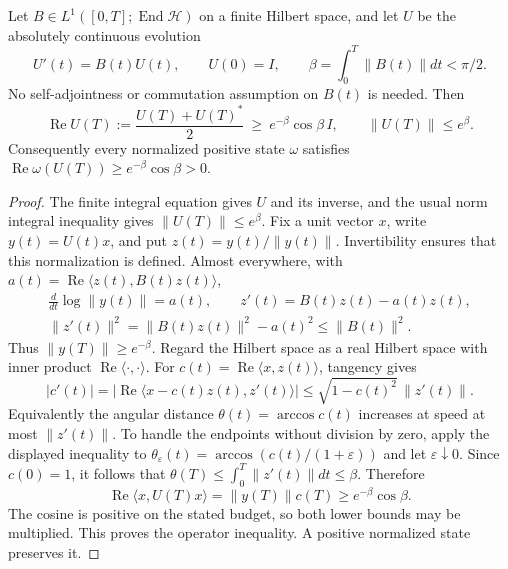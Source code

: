 \documentclass[12pt,a4paper]{article}
\begin{document}
\begin{lemma}
\label{p12:lem:v256-ordered-evolution-accretivity}
Let $B\in L^1([0,T];\operatorname{End}\mathcal H)$ on a finite
Hilbert space, and let $U$ be the absolutely continuous evolution
\[
 U'(t)=B(t)U(t),\qquad U(0)=I,\qquad
 \beta=\int_0^T\|B(t)\|dt<\pi/2.
\]
No self-adjointness or commutation assumption on $B(t)$ is needed.  Then
\begin{equation}
 \operatorname{Re}U(T):=\frac{U(T)+U(T)^*}{2}
 \ \ge\ e^{-\beta}\cos\beta\,I,
 \qquad \|U(T)\|\le e^\beta.
 \label{p12:eq:v256-ordered-accretivity}
\end{equation}
Consequently every normalized positive state $\omega$ satisfies
$\operatorname{Re}\omega(U(T))\ge e^{-\beta}\cos\beta>0$.
\end{lemma}
\begin{proof}
The finite integral equation gives $U$ and its inverse, and the usual
norm integral inequality gives $\|U(T)\|\le e^\beta$.  Fix a unit vector
$x$, write $y(t)=U(t)x$, and put $z(t)=y(t)/\|y(t)\|$.
Invertibility ensures that this normalization is defined.  Almost
everywhere, with $a(t)=\operatorname{Re}\langle z(t),B(t)z(t)\rangle$,
\[
 \begin{gathered}
 \frac{d}{dt}\log\|y(t)\|=a(t),\qquad
 z'(t)=B(t)z(t)-a(t)z(t),\\
 \|z'(t)\|^2=\|B(t)z(t)\|^2-a(t)^2\le\|B(t)\|^2.
 \end{gathered}
\]
Thus $\|y(T)\|\ge e^{-\beta}$.  Regard the Hilbert space as a real
Hilbert space with inner product $\operatorname{Re}\langle\cdot,\cdot\rangle$.
For $c(t)=\operatorname{Re}\langle x,z(t)\rangle$, tangency gives
\[
 |c'(t)|
 =|\operatorname{Re}\langle x-c(t)z(t),z'(t)\rangle|
 \le\sqrt{1-c(t)^2}\,\|z'(t)\|.
\]
Equivalently the angular distance $\theta(t)=\arccos c(t)$ increases
at speed at most $\|z'(t)\|$.  To handle the endpoints without division
by zero, apply the displayed inequality to
$\theta_\varepsilon(t)=\arccos(c(t)/(1+\varepsilon))$ and let
$\varepsilon\downarrow0$.  Since $c(0)=1$, it follows that
$\theta(T)\le\int_0^T\|z'(t)\|dt\le\beta$.  Therefore
\[
 \operatorname{Re}\langle x,U(T)x\rangle
 =\|y(T)\|c(T)\ge e^{-\beta}\cos\beta.
\]
The cosine is positive on the stated budget, so both lower bounds may
be multiplied.  This proves the operator inequality.  A positive
normalized state preserves it.
\end{proof}
\end{document}
